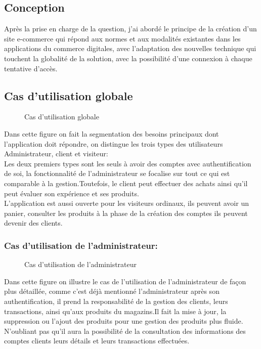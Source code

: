 \documentclass[a4paper]{report}
\begin{document}
\begin{doublespace}
	\chapter{Conception}
	Après la prise en charge de la question, j'ai abordé le
	principe de la création d'un site e-commerce qui répond aux normes et aux
	modalités existantes dans les applications du commerce digitales, avec
	l’adaptation des nouvelles technique qui touchent la globalité de la solution,
	avec la possibilité d'une connexion à chaque tentative d'accès.
	\section{Cas d'utilisation globale}
	\begin{figure}[H]
		\begin{center}
			\caption{Cas d'utilisation globale}
		\end{center}
	\end{figure}
	\newpage
	Dans cette figure on fait la segmentation des besoins
	principaux dont l'application doit répondre, on distingue les trois types des
	utilisateurs Administrateur, client et visiteur: \\Les deux premiers types sont
	les seuls à avoir des comptes avec authentification de soi, la fonctionnalité
	de l’administrateur se focalise sur tout ce qui est comparable à la
	gestion.Toutefois, le client peut effectuer des achats ainsi qu'il peut évaluer
	son expérience et ses produits. \\ L'application est aussi ouverte pour les
	visiteurs ordinaux, ils peuvent avoir un panier, consulter les produits à la
	phase de la création des comptes ils peuvent devenir des clients.

	\subsection{Cas d'utilisation de l'administrateur:}
	\begin{figure}[H]
		\begin{center}
			\caption{Cas d'utilisation de l'administrateur}
		\end{center}
	\end{figure}
	Dans cette figure on illustre le cas de l'utilisation de
	l'administrateur de façon plus détaillée, comme c'est déjà mentionné
	l'administrateur après son authentification, il prend la responsabilité de la
	gestion des clients, leurs transactions, ainsi qu'aux produits du magazins.Il
	fait la mise à jour, la suppression ou l'ajout des produits pour une gestion
	des produits plus fluide.\\ N'oubliant pas qu'il aura la possibilité de la
	consultation des informations des comptes clients leurs détails et leurs
	transactions effectuées.


\end{doublespace}
\end{document}
